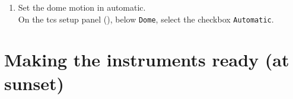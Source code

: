 \documentclass[11pt,fleqn,a4paper]{book}
\begin{document}
\begin{enumerate}
\begin{enumerate}
            \item Choose \texttt{Empty Fields 2011} ()
            \item Select field with \texttt{Up} and \texttt{Dwn}. ()\\
                  Right ascension should be about 1 hour more than sidereal time at sunset.\\
                  Consider field quality: excellent, good, OK, poor.
            \item Click \texttt{Preset}. ()
            \end{enumerate}      
         \item Set the \gls{dome} motion in automatic.\label{list:domeauto}\\
               On the \gls{tcs} setup panel (), below \texttt{Dome}, select the checkbox \texttt{Automatic}.
\end{enumerate}


\section{Making the instruments ready (at sunset)}
\label{sec:insprep}
\end{document}
